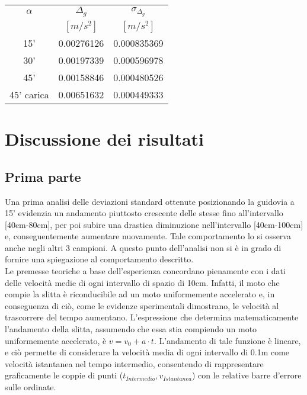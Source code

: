 \documentclass[a4paper,11pt,oneside]{article}
\begin{document}
\begin{table}[h!]
    \centering
    \begin{tabular}{c|c|c}
        \toprule
        $\alpha$ & $\Delta_g$ & $\sigma_{\Delta_g}$ \\
        &$[\si{m/s^2}]$&$[\si{m/s^2}]$\\
        
    \midrule
    15' &0.00276126 & 0.000835369 \\ 
    30' & 0.00197339 & 0.000596978 \\
    45' & 0.00158846 & 0.000480526 \\
    45' carica & 0.00651632 & 0.000449333 \\
 \bottomrule
    \end{tabular}
    \label{tab:delta_g}
\end{table}

\section{Discussione dei risultati}
\subsection{Prima parte}
Una prima analisi delle deviazioni standard ottenute posizionando la guidovia a 15' evidenzia un andamento piuttosto crescente delle stesse fino all'intervallo [40cm-80cm], per poi subire una drastica diminuzione nell'intervallo [40cm-100cm] e, conseguentemente aumentare nuovamente. Tale comportamento lo si osserva anche negli altri 3 campioni. A questo punto dell'analisi non si è in grado di fornire una spiegazione al comportamento descritto.\\

Le premesse teoriche a base dell'esperienza concordano pienamente con i dati delle velocità medie di ogni intervallo di spazio di 10\si{cm}. Infatti, il moto che compie la slitta è riconducibile ad un moto uniformemente accelerato e, in conseguenza di ciò, come le evidenze sperimentali dimostrano, le velocità al trascorrere del tempo aumentano. L'espressione che determina matematicamente l'andamento della slitta, assumendo che essa stia compiendo un moto uniformemente accelerato, è $v=v_{0}+a\cdot t$. L'andamento di tale funzione è lineare, e ciò permette di considerare la velocità media di ogni intervallo di 0.1\si{m} come velocità istantanea nel tempo intermedio, consentendo di rappresentare graficamente le coppie di punti ($t_{Intermedio}, v_{Istantanea}$) con  le relative barre d'errore sulle ordinate.\\
\end{document}

